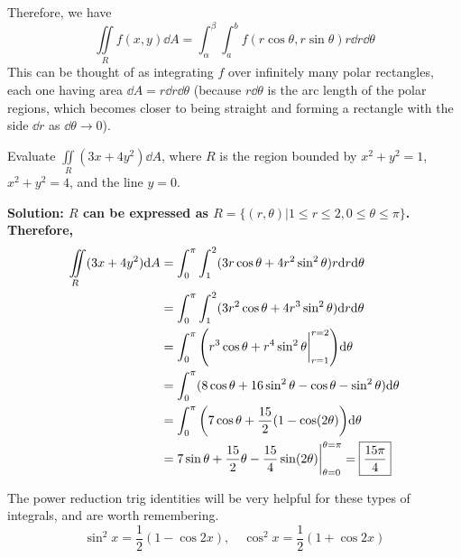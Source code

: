 Therefore, we have
\[ \iint\limits_R f(x, y)\dd A = \int_{\alpha}^{\beta}\int_{a}^bf(r\cos\theta, r\sin\theta)r\dd r\dd \theta \]
This can be thought of as integrating \( f \) over infinitely many polar rectangles, each one having area \( \dd A = r\dd r\dd \theta \) (because \( r\dd \theta \) is the arc length of the polar regions, which becomes closer to being straight and forming a rectangle with the side \( \dd r \) as \( \dd \theta \to 0 \)).
\begin{example}
    Evaluate \( \iint\limits_R(3x+4y^2)\dd A \), where \( R \) is the region bounded by \( x^2+y^2=1 \), \( x^2+y^2=4 \), and the line \( y=0 \). \par\bf{Solution}:
    \( R \) can be expressed as \( R = \{ (r,\theta)|1\leq r\leq 2, 0\leq \theta\leq \pi\} \). Therefore,
    \begin{align*}
        \iint\limits_R (3x+4y^2)\dd A &= \int_0^\pi\int_1^2(3r\cos\theta + 4r^2\sin^2\theta)r\dd r\dd \theta \\
        &= \int_0^\pi\int_1^2(3r^2\cos\theta + 4r^3\sin^2\theta)\dd r\dd \theta \\
        &= \int_0^\pi\pqty{r^3\cos\theta+r^4\sin^2\theta\biggr|_{r=1}^{r=2}}\dd \theta \\
        &= \int_0^\pi (8\cos\theta + 16\sin^2\theta - \cos\theta - \sin^2\theta)\dd \theta \\
        &= \int_0^\pi \pqty{7\cos\theta + \frac{15}{2}(1-\cos(2\theta)}\dd \theta \\
        &= 7\sin\theta + \frac{15}{2}\theta -\frac{15}{4}\sin(2\theta)\biggr|_{\theta=0}^{\theta=\pi} = \boxed{\frac{15\pi}{4}}
    \end{align*}
\end{example}
The power reduction trig identities will be very helpful for these types of integrals, and are worth remembering.
\[ \sin^2x = \frac{1}{2}(1-\cos 2x), \quad \cos^2x = \frac{1}{2}(1+\cos 2x) \]
